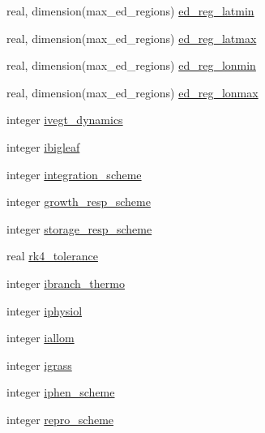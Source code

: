 \begin{DoxyCompactItemize}
\item 
real, dimension(max\+\_\+ed\+\_\+regions) \hyperlink{structename__coms_1_1ename__vars_ab40bb9d48bd5da18f360a9a1b947a6be}{ed\+\_\+reg\+\_\+latmin}
\item 
real, dimension(max\+\_\+ed\+\_\+regions) \hyperlink{structename__coms_1_1ename__vars_a4cf2be6e099c9cd1952ac1a1869167c9}{ed\+\_\+reg\+\_\+latmax}
\item 
real, dimension(max\+\_\+ed\+\_\+regions) \hyperlink{structename__coms_1_1ename__vars_aefda5886f022371934a180b6115bebd6}{ed\+\_\+reg\+\_\+lonmin}
\item 
real, dimension(max\+\_\+ed\+\_\+regions) \hyperlink{structename__coms_1_1ename__vars_a4420dd1c6597e93ab844c82f24c76a18}{ed\+\_\+reg\+\_\+lonmax}
\item 
integer \hyperlink{structename__coms_1_1ename__vars_a77d3edca4c3263b115cd477e8685567f}{ivegt\+\_\+dynamics}
\item 
integer \hyperlink{structename__coms_1_1ename__vars_a665f6826b104e44b914c166e537cb908}{ibigleaf}
\item 
integer \hyperlink{structename__coms_1_1ename__vars_a811a254960c1881a7d6f16ac2d5ef8bf}{integration\+\_\+scheme}
\item 
integer \hyperlink{structename__coms_1_1ename__vars_af02bfe53731b8ca56832a0ed00650245}{growth\+\_\+resp\+\_\+scheme}
\item 
integer \hyperlink{structename__coms_1_1ename__vars_a872a3e1b6e31ec87cbeefc9a7f907950}{storage\+\_\+resp\+\_\+scheme}
\item 
real \hyperlink{structename__coms_1_1ename__vars_aae63f7803d4d5a73cf22dccea7627df1}{rk4\+\_\+tolerance}
\item 
integer \hyperlink{structename__coms_1_1ename__vars_a38c739425e2f3e54a9cd5f8eb537059d}{ibranch\+\_\+thermo}
\item 
integer \hyperlink{structename__coms_1_1ename__vars_aacdc7472a91c186374aa3056ca6643ab}{iphysiol}
\item 
integer \hyperlink{structename__coms_1_1ename__vars_a34cfcb0dfeced998d963db40d137df19}{iallom}
\item 
integer \hyperlink{structename__coms_1_1ename__vars_a8f90db2093118dc494132c1beb6f12b5}{igrass}
\item 
integer \hyperlink{structename__coms_1_1ename__vars_a910fe9226616c88e0ef243f817d6556e}{iphen\+\_\+scheme}
\item 
integer \hyperlink{structename__coms_1_1ename__vars_ae98c0083c4b37be6b91a7e1fc2237591}{repro\+\_\+scheme}
\item 

\end{DoxyCompactItemize}
